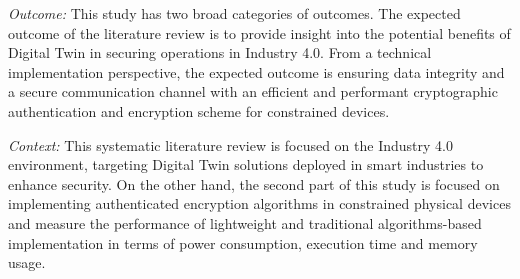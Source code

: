 \textit{Outcome:} This study has two broad categories of outcomes. The expected outcome of the literature review is to provide insight into the potential benefits of Digital Twin in securing operations in Industry 4.0. From a technical implementation perspective, the expected outcome is ensuring data integrity and a secure communication channel with an efficient and performant cryptographic authentication and encryption scheme for constrained devices.

\textit{Context:} This systematic literature review is focused on the Industry 4.0 environment, targeting Digital Twin solutions deployed in smart industries to enhance security. On the other hand, the second part of this study is focused on implementing authenticated encryption algorithms in constrained physical devices and measure the performance of lightweight and traditional algorithms-based implementation in terms of power consumption, execution time and memory usage. 